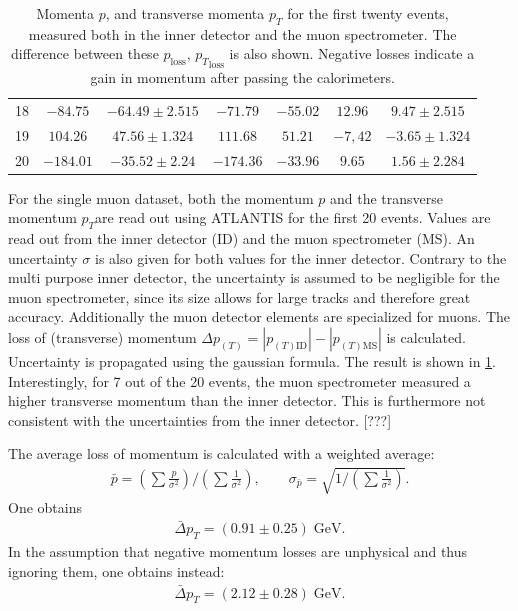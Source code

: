 \documentclass[twoside,        %
               BCOR12mm,       %
               ngerman,english, %
               fleqn,headsepline=false,footsepline=false
              ]{Vorlage/MFPREPORT}
\begin{document}
\begin{table}
\begin{tabular}{|c|c|c|c|c|c|c|}
  18&$-84.75$&$-64.49\pm 2.515$&$-71.79$&$-55.02$&$12.96$&$9.47\pm 2.515$\\
  19&$104.26$&$47.56\pm 1.324$&$111.68$&$51.21$&$-7,42$&$-3.65\pm 1.324$\\
  20&$-184.01$&$-35.52\pm 2.24$&$-174.36$&$-33.96$&$9.65$&$1.56\pm 2.284$\\
  \hline
  \end{tabular}
  \caption{Momenta $p$, and transverse momenta $p_T$ for the first twenty
  events, measured both in the inner detector and the muon spectrometer. The
  difference between these $p_\text{loss}$, ${p_T}_\text{loss}$ is also shown.
  Negative losses indicate a gain in momentum after passing the calorimeters.}
  \label{tab:loss}
\end{table}

For the single muon dataset, both the momentum $p$ and the transverse momentum
$p_T$are
read out using ATLANTIS for the first 20 events. Values are read out from the
inner detector (ID) and the muon spectrometer (MS). An uncertainty $\sigma$ is
also given for both values for the inner detector. Contrary to the multi
purpose inner detector, the uncertainty is assumed to be negligible for the
muon spectrometer, since its size allows for large tracks and therefore great
accuracy. Additionally the muon detector elements are specialized for muons.
The loss of (transverse) momentum
$\Delta{{p}_{(T)}}=|p_{(T)\text{ID}}|-|p_{(T)\text{MS}}|$ is
calculated. Uncertainty is propagated using the gaussian formula. The result is
shown in \cref{tab:loss}.
Interestingly, for 7 out of the 20 events, the muon spectrometer measured a
higher transverse momentum than the inner detector. This is furthermore not
consistent with the uncertainties from the inner detector. [???]

The average loss of momentum is calculated with a weighted
average:
\begin{align}
    \bar p = (\sum \frac{p}{\sigma^2})/(\sum \frac{1}{\sigma^2}),\qquad \sigma_{\bar p} = \sqrt{1/(\sum \frac{1}{\sigma^2})}.
\end{align}
One obtains
\begin{align}
    \label{eq:resavg1}
    \bar{\Delta}{{p}_{T}}=(0.91\pm0.25)\;\text{GeV}.
\end{align}
In the assumption that negative momentum losses are unphysical and thus
ignoring them, one obtains instead:
\begin{align}
    \bar{\Delta}{{p}_{T}}=(2.12\pm0.28)\;\text{GeV}.
\end{align}
\end{document}
